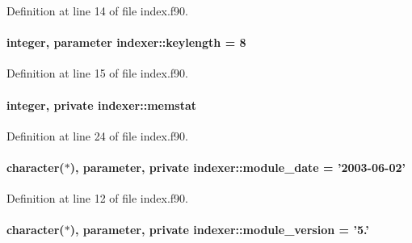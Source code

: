 Definition at line 14 of file index.\-f90.

\hypertarget{classindexer_a7d27658efaa0adbd2ff73e05efd3e12d}{
\paragraph[{keylength}]{\setlength{\rightskip}{0pt plus 5cm}integer, parameter indexer\-::keylength = 8}}\label{classindexer_a7d27658efaa0adbd2ff73e05efd3e12d}


Definition at line 15 of file index.\-f90.

\hypertarget{classindexer_a1eeafbfa968ae1bb35d75cd695283372}{
\paragraph[{memstat}]{\setlength{\rightskip}{0pt plus 5cm}integer, private indexer\-::memstat\hspace{0.3cm}{\ttfamily [private]}}}\label{classindexer_a1eeafbfa968ae1bb35d75cd695283372}


Definition at line 24 of file index.\-f90.

\hypertarget{classindexer_a7dcf9d6ea120fb63808be7860ae3c2c7}{
\paragraph[{module\-\_\-date}]{\setlength{\rightskip}{0pt plus 5cm}character($\ast$), parameter, private indexer\-::module\-\_\-date = '2003-\/06-\/02'\hspace{0.3cm}{\ttfamily [private]}}}\label{classindexer_a7dcf9d6ea120fb63808be7860ae3c2c7}


Definition at line 12 of file index.\-f90.

\hypertarget{classindexer_a34d9eec9fe88c19039a4f4b77901b6f3}{
\paragraph[{module\-\_\-version}]{\setlength{\rightskip}{0pt plus 5cm}character($\ast$), parameter, private indexer\-::module\-\_\-version = '5.'\hspace{0.3cm}{\ttfamily [private]}}}\label{classindexer_a34d9eec9fe88c19039a4f4b77901b6f3}


